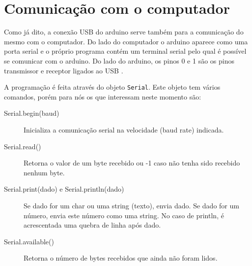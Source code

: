 \section{Comunicação com o computador}
Como já dito, a conexão USB do arduino serve também para a comunicação do mesmo com o computador. Do lado do computador o arduino aparece como uma porta serial e o próprio programa contém um terminal serial pelo qual é possível se comunicar com o arduino. Do lado do arduino, os pinos 0 e 1 são os pinos transmissor e receptor ligados ao USB .

A programação é feita através do objeto  \lstinline|Serial|. Este objeto tem vários comandos, porém para nós os que interessam neste momento são:
\begin{description}
	\item[Serial.begin(baud)] Inicializa a comunicação serial na velocidade (baud rate) indicada.
	\item[Serial.read()] Retorna o valor de um byte recebido ou -1 caso não tenha sido recebido nenhum byte.
	\item[Serial.print(dado) e Serial.println(dado)] Se dado for um char ou uma string (texto), envia dado. Se dado for um número, envia este número como uma string. No caso de println, é acrescentada uma quebra de linha após dado.
	\item[Serial.available()] Retorna o número de bytes recebidos que ainda não foram lidos.
\end{description}


